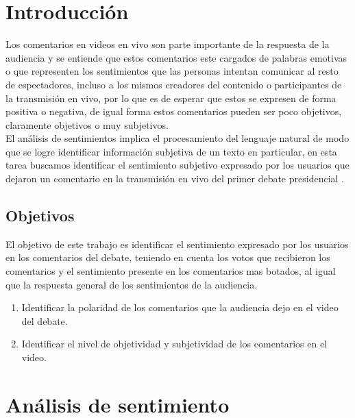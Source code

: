 \chapter{Introducción}

Los comentarios en videos en vivo son parte importante de la respuesta de la audiencia y se entiende que estos comentarios este cargados de palabras emotivas o que representen los sentimientos que las personas intentan comunicar al resto de espectadores, incluso a los mismos creadores del contenido o participantes de la transmisión en vivo, por lo que es de esperar que estos se expresen de forma positiva o negativa, de igual forma estos comentarios pueden ser poco objetivos, claramente objetivos o muy subjetivos.\\

El análisis de sentimientos implica el procesamiento del lenguaje natural de modo que se logre identificar información subjetiva de un texto en particular, en esta tarea buscamos identificar el sentimiento subjetivo expresado por los usuarios que dejaron un comentario en la transmisión en vivo del primer debate presidencial \cite{quiroga2016}.\\

\section{Objetivos}
El objetivo de este trabajo es identificar el sentimiento expresado por los usuarios en los comentarios del debate, teniendo en cuenta los votos que recibieron los comentarios y el sentimiento presente en los comentarios mas botados, al igual que la respuesta general de los sentimientos de la audiencia.\\ 

\begin{enumerate}
	\item Identificar la polaridad de los comentarios que la audiencia dejo en el video del debate.\\
	
	\item Identificar el nivel de objetividad y subjetividad de los comentarios en el video.\\
	
\end{enumerate}

\chapter{Análisis de sentimiento}

